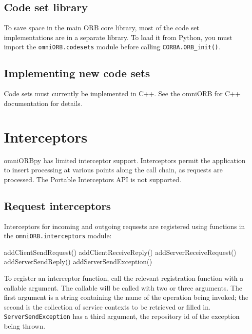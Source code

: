 \documentclass[11pt,oneside,a4paper]{book}
\newcommand{\code}[1]{\texttt{#1}}
\newcommand{\op}[1]{\texttt{#1()}}
\newcommand{\dsc}{\discretionary{}{}{}}
\begin{document}
\section{Code set library}

To save space in the main ORB core library, most of the code set
implementations are in a separate library. To load it from Python, you
must import the \code{omniORB.\dsc{}codesets} module before calling
\op{CORBA.ORB\_init}.


\section{Implementing new code sets}

Code sets must currently be implemented in C++. See the omniORB for
C++ documentation for details.



\chapter{Interceptors}
\label{chap:interceptors}

omniORBpy has limited interceptor support. Interceptors permit the
application to insert processing at various points along the call
chain, as requests are processed. The Portable Interceptors API is not
supported.

\section{Request interceptors}

Interceptors for incoming and outgoing requests are registered using
functions in the \code{omniORB.interceptors} module:

\begin{pylisting}
  addClientSendRequest()
  addClientReceiveReply()
  addServerReceiveRequest()
  addServerSendReply()
  addServerSendException()
\end{pylisting}

To register an interceptor function, call the relevant registration
function with a callable argument. The callable will be called with
two or three arguments. The first argument is a string containing the
name of the operation being invoked; the second is the collection of
service contexts to be retrieved or filled in.
\code{ServerSendException} has a third argument, the repository id of
the exception being thrown.
\end{document}
